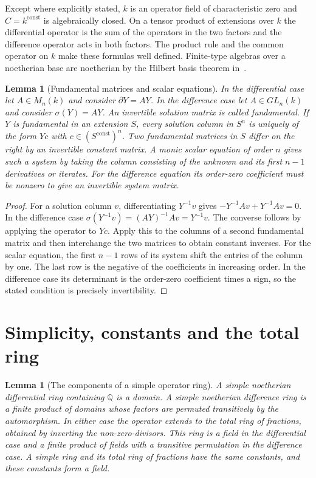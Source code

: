 \documentclass[11pt,oneside,openany]{book}
\newtheorem{lemma}[theorem]{Lemma}
\theoremstyle{definition}
\theoremstyle{remark}
\begin{document}
Except where explicitly stated, \(k\) is an operator field of
characteristic zero and \(C=k^{\mathrm{const}}\) is algebraically
closed. On a tensor product of extensions over \(k\) the differential
operator is the sum of the operators in the two factors and the
difference operator acts in both factors. The product rule and the
common operator on \(k\) make these formulas well defined.
Finite-type algebras over a noetherian base are noetherian
by the Hilbert basis theorem in~\cite[Section 23.11, PDF p.~191]{mg-d07}.

\begin{lemma}[Fundamental matrices and scalar equations]
\label{res:PV02}
In the differential case let \(A\in M_n(k)\) and consider
\(\partial Y=AY\). In the difference case let \(A\in GL_n(k)\)
and consider \(\sigma(Y)=AY\). An invertible solution matrix is
called fundamental. If \(Y\) is fundamental in an extension \(S\),
every solution column in \(S^n\) is uniquely of the form \(Yc\) with
\(c\in(S^{\mathrm{const}})^n\). Two fundamental matrices in \(S\)
differ on the right by an invertible constant matrix.
A monic scalar equation of order \(n\) gives such a system by taking
the column consisting of the unknown and its first \(n-1\) derivatives
or iterates. For the difference equation its order-zero coefficient
must be nonzero to give an invertible system matrix.
\end{lemma}

\begin{proof}
For a solution column \(v\), differentiating \(Y^{-1}v\) gives
\(-Y^{-1}Av+Y^{-1}Av=0\). In the difference case
\(\sigma(Y^{-1}v)=(AY)^{-1}Av=Y^{-1}v\).
The converse follows by applying the operator to \(Yc\).
Apply this to the columns of a second fundamental matrix and then
interchange the two matrices to obtain constant inverses.
For the scalar equation, the first \(n-1\) rows of its system shift the
entries of the column by one. The last row is the negative of the
coefficients in increasing order. In the difference case its determinant
is the order-zero coefficient times a sign, so the stated condition
is precisely invertibility.
\end{proof}

\section{Simplicity, constants and the total ring}

\begin{lemma}[The components of a simple operator ring]
\label{res:PV03}
A simple noetherian differential ring containing \(\mathbb Q\) is a
domain. A simple noetherian difference ring is a finite product of
domains whose factors are permuted transitively by the automorphism.
In either case the operator extends to the total ring of fractions,
obtained by inverting the non-zero-divisors. This ring is a field in
the differential case and a finite product of fields with a transitive
permutation in the difference case. A simple ring and its total ring
of fractions have the same constants, and these constants form a field.
\end{lemma}
\end{document}
